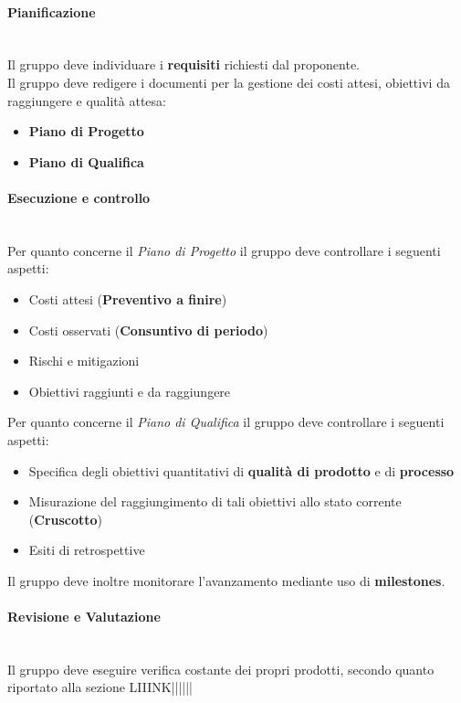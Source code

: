 \paragraph{Pianificazione}
\mbox{} \\
Il gruppo deve individuare i \textbf{requisiti} richiesti dal proponente.\\
Il gruppo deve redigere i documenti per la gestione dei costi attesi, obiettivi da raggiungere e qualità attesa:
\begin{itemize}
    \item \textbf{Piano di Progetto}
    \item \textbf{Piano di Qualifica}
\end{itemize}

\paragraph{Esecuzione e controllo}
\mbox{} \\
Per quanto concerne il \textit{Piano di Progetto} il gruppo deve controllare i seguenti aspetti:
\begin{itemize}
    \item Costi attesi (\textbf{Preventivo a finire})
    \item Costi osservati (\textbf{Consuntivo di periodo})
    \item Rischi e mitigazioni
    \item Obiettivi raggiunti e da raggiungere
\end{itemize}
Per quanto concerne il \textit{Piano di Qualifica} il gruppo deve controllare i seguenti aspetti:
\begin{itemize}
    \item Specifica degli obiettivi quantitativi di \textbf{qualità di prodotto} e di \textbf{processo}
    \item Misurazione del raggiungimento di tali obiettivi allo stato corrente (\textbf{Cruscotto})
    \item Esiti di retrospettive
\end{itemize}

Il gruppo deve inoltre monitorare l'avanzamento mediante uso di \textbf{milestones}.

\paragraph{Revisione e Valutazione}
\mbox{} \\
Il gruppo deve eseguire verifica costante dei propri prodotti, secondo quanto riportato alla sezione LIIINK||||||

